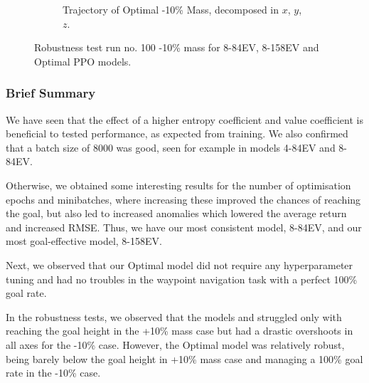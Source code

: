 \begin{figure}[H]
\begin{subfigure}[b]{0.49\textwidth}
         \caption{Trajectory of Optimal -10\% Mass, decomposed in $x$, $y$, $z$.}
         \label{fig:testing_robust-10_ppoOptimal2}
     \end{subfigure}
    \captionsetup{justification=centering}
    \caption{Robustness test run no. 100 -10\% mass for 8-84EV, 8-158EV and Optimal PPO models.}
     \label{fig:5_testing_robust-10_PPO}
\end{figure}


\subsubsection{Brief Summary}
We have seen that the effect of a higher entropy coefficient and value coefficient is beneficial to tested performance, as expected from training. We also confirmed that a batch size of 8000 was good, seen for example in models 4-84EV and 8-84EV.

Otherwise, we obtained some interesting results for the number of optimisation epochs and minibatches, where increasing these improved the chances of reaching the goal, but also led to increased anomalies which lowered the average return and increased RMSE. Thus, we have our most consistent model, 8-84EV, and our most goal-effective model, 8-158EV.

Next, we observed that our Optimal model did not require any hyperparameter tuning and had no troubles in the waypoint navigation task with a perfect 100\% goal rate.

In the robustness tests, we observed that the models \six and \ten struggled only with reaching the goal height in the +10\% mass case but had a drastic overshoots in all axes for the -10\% case. However, the Optimal model was relatively robust, being barely below the goal height in  +10\% mass case and managing a 100\% goal rate in the -10\% case.


